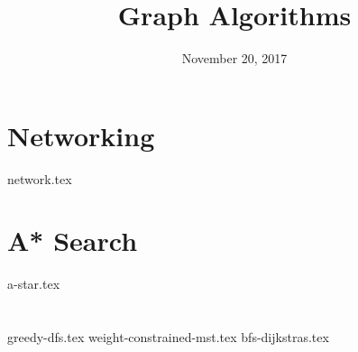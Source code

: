\documentclass[11pt]{exam}
\title{Graph Algorithms}
\date{November 20, 2017}
\begin{document}
\maketitle

\section{Networking}
\begin{questions}
{network.tex}
\end{questions}

\section{A* Search}
\begin{questions}
{a-star.tex}
\end{questions}

\section{}
\begin{questions}
{greedy-dfs.tex}
{weight-constrained-mst.tex}
{bfs-dijkstras.tex}
\end{questions}
\end{document}
